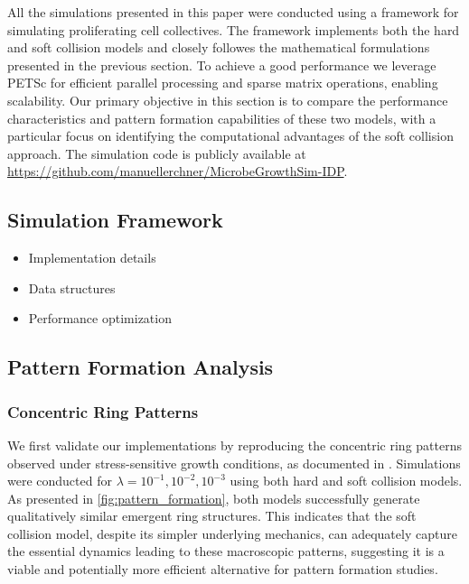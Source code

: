 \documentclass[conference]{IEEEtran}
\begin{document}
All the simulations presented in this paper were conducted using a framework for simulating proliferating cell collectives. The framework implements both the hard and soft collision models and closely followes the mathematical formulations presented in the previous section. To achieve a good performance we leverage PETSc \cite{petsc-web-page} for efficient parallel processing and sparse matrix operations, enabling scalability. Our primary objective in this section is to compare the performance characteristics and pattern formation capabilities of these two models, with a particular focus on identifying the computational advantages of the soft collision approach. The simulation code is publicly available at {\color{blue}\url{https://github.com/manuellerchner/MicrobeGrowthSim-IDP}}.








\subsection{Simulation Framework}
\begin{itemize}
    \item Implementation details
    \item Data structures
    \item Performance optimization
\end{itemize}

\newpage

\subsection{Pattern Formation Analysis}

\subsubsection{Concentric Ring Patterns}

We first validate our implementations by reproducing the concentric ring patterns observed under stress-sensitive growth conditions, as documented in \cite{Weady2024}. Simulations were conducted for $\lambda = 10^{-1}, 10^{-2}, 10^{-3}$ using both hard and soft collision models. As presented in \autoref{fig:pattern_formation}, both models successfully generate qualitatively similar emergent ring structures. This indicates that the soft collision model, despite its simpler underlying mechanics, can adequately capture the essential dynamics leading to these macroscopic patterns, suggesting it is a viable and potentially more efficient alternative for pattern formation studies.
\end{document}
